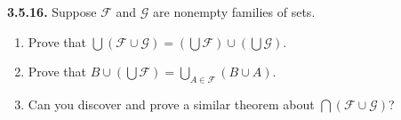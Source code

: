 \documentclass[12pt]{amsart}
\newenvironment{statement}[1]{\smallskip\noindent\color[rgb]{.6627, .3529, .6314} {\bf #1.}}{}
\theoremstyle{definition}
\theoremstyle{remark}
\begin{document}
\begin{statement}{3.5.16}
Suppose $\mathcal{F}$ and $\mathcal{G}$ are nonempty families of sets.
\begin{enumerate}
	\item Prove that $\bigcup (\mathcal{F} \cup \mathcal{G}) =
	\left( \bigcup \mathcal{F} \right) \cup \left( \bigcup \mathcal{G} \right)$.
	
	\item Prove that $B \cup \left( \bigcup \mathcal{F} \right) = 
	\bigcup_{A \in \mathcal{F}} (B \cup A)$.
	
	\item Can you discover and prove a similar theorem about
	$\bigcap (\mathcal{F} \cup \mathcal{G})$?
\end{enumerate}
\end{statement}
\end{document}
